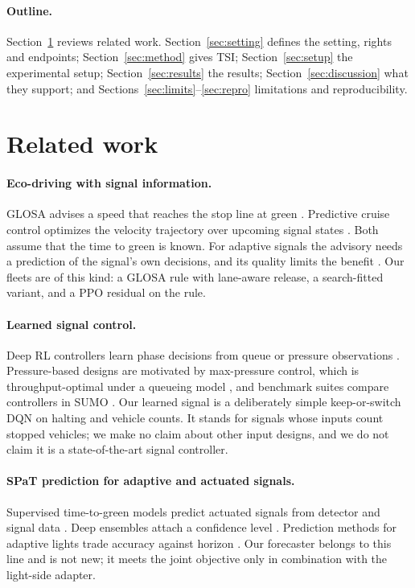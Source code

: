 \documentclass[11pt]{article}
\begin{document}
\paragraph{Outline.} Section~\ref{sec:related} reviews related work. Section~\ref{sec:setting} defines the setting, rights and endpoints;
Section~\ref{sec:method} gives TSI; Section~\ref{sec:setup} the experimental setup; Section~\ref{sec:results} the results;
Section~\ref{sec:discussion} what they support; and Sections~\ref{sec:limits}--\ref{sec:repro} limitations and reproducibility.

\section{Related work}\label{sec:related}
\paragraph{Eco-driving with signal information.} GLOSA advises a speed that reaches the stop line at green
\cite{katsaros2011}. Predictive cruise control optimizes the velocity trajectory over upcoming signal states \cite{asadi2011}. Both assume
that the time to green is known. For adaptive signals the advisory needs a prediction of the signal's own decisions, and its quality limits
the benefit \cite{bodenheimer2014}. Our fleets are of this kind: a GLOSA rule with lane-aware release, a search-fitted variant, and a PPO
residual on the rule.
\paragraph{Learned signal control.} Deep RL controllers learn phase decisions from queue or pressure observations \cite{wei2018,wei2019}.
Pressure-based designs are motivated by max-pressure control, which is throughput-optimal under a queueing model \cite{varaiya2013}, and
benchmark suites compare controllers in SUMO \cite{ault2021}. Our learned signal is a deliberately simple keep-or-switch DQN on halting and
vehicle counts. It stands for signals whose inputs count stopped vehicles; we make no claim about other input designs, and we do not claim
it is a state-of-the-art signal controller.
\paragraph{SPaT prediction for adaptive and actuated signals.} Supervised time-to-green models predict actuated signals from detector and
signal data \cite{genser2024}. Deep ensembles attach a confidence level \cite{eteifa2025}. Prediction methods for adaptive lights trade
accuracy against horizon \cite{bodenheimer2014}. Our forecaster belongs to this line and is not new; it meets the joint objective only in
combination with the light-side adapter.
\end{document}
